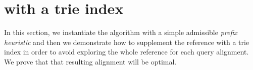 \section{\A with a trie index} \label{TRIEsec:astarix-algo}

In this section, we instantiate the \A algorithm with a simple admissible
\emph{prefix heuristic} and then we demonstrate how to supplement the reference
with a trie index in order to avoid exploring the whole reference for each query
alignment. We prove that that resulting alignment will be optimal.



